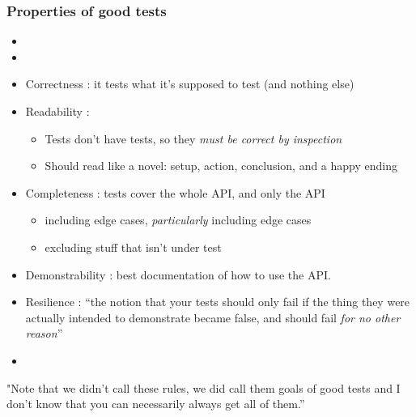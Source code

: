 \begin{frame}[fragile,t]
\frametitle{Properties of good tests}

\begin{itemize}
\item {}
\item {}
\item Correctness : it tests what it's supposed to test (and
  nothing else)
\item Readability :
\begin{itemize}
  \item Tests don't have tests, so they \emph{must be correct by inspection}
  \item Should read like a novel: setup, action, conclusion, and a happy ending
\end{itemize}
\item Completeness : tests cover the whole API, and only the API
  \begin{itemize}
  \item including edge cases, \emph{particularly} including edge cases
  \item excluding stuff that isn't under test
  \end{itemize}
\item Demonstrability : best documentation of how to use the API.
\item Resilience : ``the notion that your tests should only fail if the
  thing they were actually intended to demonstrate became false, and
  should fail \emph{for no other reason}''
\item {}
\end{itemize}

"Note that we didn't call these rules, we did call them goals of good
tests and I don't know that you can necessarily always get all of
them.''


\end{frame}

